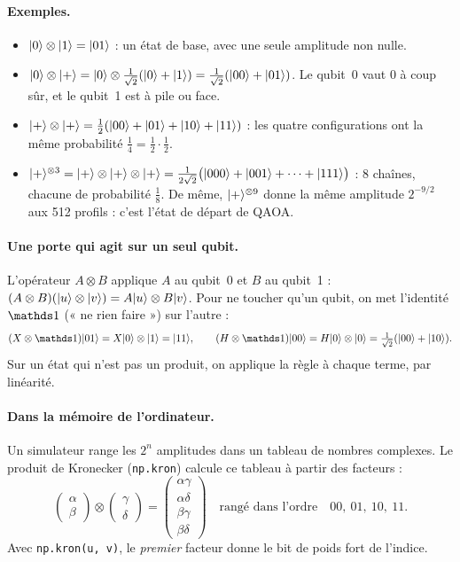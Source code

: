 \paragraph{Exemples.}
\begin{itemize}
\item $\lvert 0\rangle\otimes\lvert 1\rangle=\lvert 01\rangle$ : un état de base, avec une seule amplitude non nulle.
\item $\lvert 0\rangle\otimes\lvert +\rangle=\lvert 0\rangle\otimes\tfrac1{\sqrt2}(\lvert 0\rangle+\lvert 1\rangle)=\tfrac1{\sqrt2}(\lvert 00\rangle+\lvert 01\rangle)$. Le qubit~0 vaut 0 à coup sûr, et le qubit~1 est à pile ou face.
\item $\lvert +\rangle\otimes\lvert +\rangle=\tfrac12(\lvert 00\rangle+\lvert 01\rangle+\lvert 10\rangle+\lvert 11\rangle)$ : les quatre configurations ont la même probabilité $\tfrac14=\tfrac12\cdot\tfrac12$.
\item $\lvert +\rangle^{\otimes3}=\lvert +\rangle\otimes\lvert +\rangle\otimes\lvert +\rangle=\tfrac1{2\sqrt2}\big(\lvert 000\rangle+\lvert 001\rangle+\dots+\lvert 111\rangle\big)$ : 8 chaînes, chacune de probabilité $\tfrac18$. De même, $\lvert +\rangle^{\otimes9}$ donne la même amplitude $2^{-9/2}$ aux 512 profils : c'est l'état de départ de QAOA.
\end{itemize}

\paragraph{Une porte qui agit sur un seul qubit.} L'opérateur $A\otimes B$ applique $A$ au qubit~0 et $B$ au qubit~1 : $(A\otimes B)(\lvert u\rangle\otimes\lvert v\rangle)=A\lvert u\rangle\otimes B\lvert v\rangle$. Pour ne toucher qu'un qubit, on met l'identité $\Id$ (« ne rien faire ») sur l'autre :
\[
(X\otimes\Id)\ket{01}=X\ket0\otimes\ket1=\ket{11},\qquad (H\otimes\Id)\ket{00}=H\ket0\otimes\ket0=\tfrac1{\sqrt2}(\ket{00}+\ket{10}).
\]
Sur un état qui n'est pas un produit, on applique la règle à chaque terme, par linéarité.

\paragraph{Dans la mémoire de l'ordinateur.} Un simulateur range les $2^n$ amplitudes dans un tableau de nombres complexes. Le produit de Kronecker (\texttt{np.kron}) calcule ce tableau à partir des facteurs :
\[
\begin{pmatrix}\alpha\\\beta\end{pmatrix}\otimes\begin{pmatrix}\gamma\\\delta\end{pmatrix}=\begin{pmatrix}\alpha\gamma\\\alpha\delta\\\beta\gamma\\\beta\delta\end{pmatrix}
\quad\text{rangé dans l'ordre}\quad 00,\ 01,\ 10,\ 11 .
\]
Avec \texttt{np.kron(u, v)}, le \emph{premier} facteur donne le bit de poids fort de l'indice.

